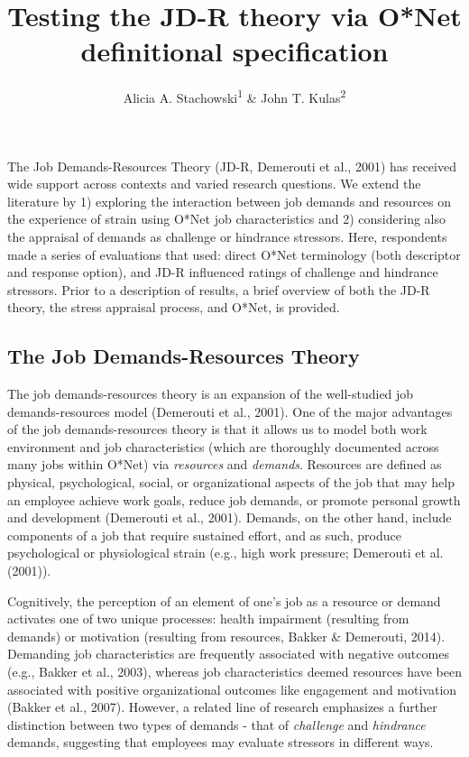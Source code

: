 \documentclass[
  english,
  man]{apa6}
\title{Testing the JD-R theory via O*Net definitional specification}
\author{Alicia A. Stachowski\textsuperscript{1} \& John T. Kulas\textsuperscript{2}}
\date{}
\affiliation{\vspace{0.5cm}\textsuperscript{1} University of Wisconsin - Stout\\\textsuperscript{2} eRg}
\begin{document}
\maketitle

The Job Demands-Resources Theory (JD-R, Demerouti et al., 2001) has received wide support across contexts and varied research questions. We extend the literature by 1) exploring the interaction between job demands and resources on the experience of strain using O*Net job characteristics and 2) considering also the appraisal of demands as challenge or hindrance stressors. Here, respondents made a series of evaluations that used: direct O*Net terminology (both descriptor and response option), and JD-R influenced ratings of challenge and hindrance stressors. Prior to a description of results, a brief overview of both the JD-R theory, the stress appraisal process, and O*Net, is provided.

\hypertarget{the-job-demands-resources-theory}{%
\subsection{The Job Demands-Resources Theory}\label{the-job-demands-resources-theory}}

The job demands-resources theory is an expansion of the well-studied job demands-resources model (Demerouti et al., 2001). One of the major advantages of the job demands-resources theory is that it allows us to model both work environment and job characteristics (which are thoroughly documented across many jobs within O*Net) via \emph{resources} and \emph{demands}. Resources are defined as physical, psychological, social, or organizational aspects of the job that may help an employee achieve work goals, reduce job demands, or promote personal growth and development (Demerouti et al., 2001). Demands, on the other hand, include components of a job that require sustained effort, and as such, produce psychological or physiological strain (e.g., high work pressure; Demerouti et al. (2001)).

Cognitively, the perception of an element of one's job as a resource or demand activates one of two unique processes: health impairment (resulting from demands) or motivation (resulting from resources, Bakker \& Demerouti, 2014). Demanding job characteristics are frequently associated with negative outcomes (e.g., Bakker et al., 2003), whereas job characteristics deemed resources have been associated with positive organizational outcomes like engagement and motivation (Bakker et al., 2007). However, a related line of research emphasizes a further distinction between two types of demands - that of \emph{challenge} and \emph{hindrance} demands, suggesting that employees may evaluate stressors in different ways.
\end{document}
